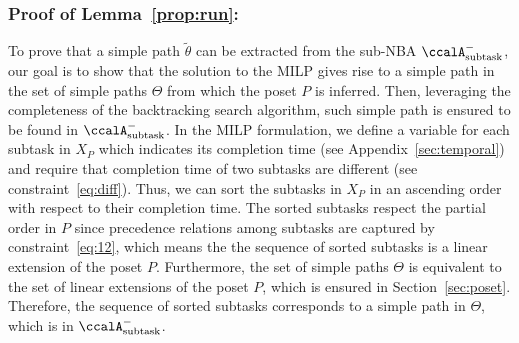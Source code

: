 \documentclass[Afour,sageh,times]{sagej}
\newcommand{\auto}[1]{\ccalA_{\textup{#1}}}
\begin{document}
{{%

\subsubsection{Proof of Lemma~\ref{prop:run}:}\label{app:run}
To prove that a simple path $\tilde{\theta}$ can be extracted from the sub-NBA $\auto{subtask}^-$,  our goal is to show that the solution to the MILP gives rise to a simple path   in the set of simple paths $\Theta$ from which the poset $P$ is inferred. Then, leveraging the completeness of the  backtracking search algorithm,  such simple path is ensured to be found in $\auto{subtask}^-$. In the MILP formulation, we define a variable for each subtask in $X_P$ which indicates its completion time (see Appendix~\ref{sec:temporal}) and require that completion time of two subtasks are different (see constraint~\eqref{eq:diff}).  Thus, we can sort the subtasks in $X_P$  in an ascending order with respect to their completion time. The sorted subtasks respect the partial order in $P$ since precedence relations among subtasks are captured by constraint~\eqref{eq:12}, which means the the sequence  of sorted subtasks is a linear extension of the poset $P$. Furthermore, the set of simple paths $\Theta$ is equivalent to the set of  linear extensions of the poset $P$, which is ensured in Section~\ref{sec:poset}. Therefore, the sequence of sorted subtasks corresponds to a simple path in $\Theta$, which is in $\auto{subtask}^-$.


}}
\end{document}
